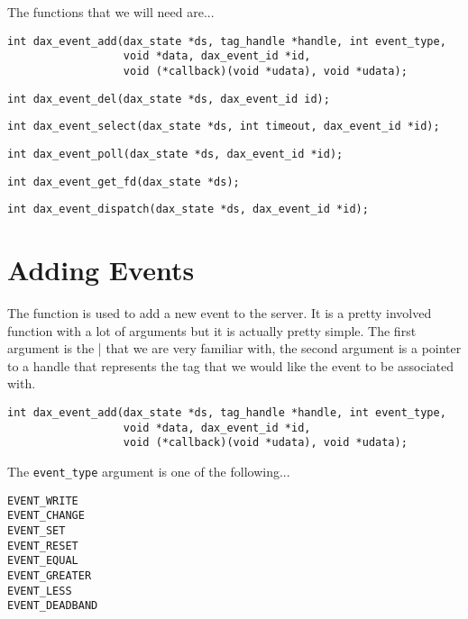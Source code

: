The functions that we will need are...

\begin{verbatim}
int dax_event_add(dax_state *ds, tag_handle *handle, int event_type,
                  void *data, dax_event_id *id, 
                  void (*callback)(void *udata), void *udata);
\end{verbatim}
\begin{verbatim}
int dax_event_del(dax_state *ds, dax_event_id id);
\end{verbatim}
\begin{verbatim}
int dax_event_select(dax_state *ds, int timeout, dax_event_id *id);
\end{verbatim}
\begin{verbatim}
int dax_event_poll(dax_state *ds, dax_event_id *id);
\end{verbatim}
\begin{verbatim}
int dax_event_get_fd(dax_state *ds);
\end{verbatim}
\begin{verbatim}
int dax_event_dispatch(dax_state *ds, dax_event_id *id);
\end{verbatim}

\section{Adding Events}

The \eventadd{} function is used to add a new event to the server.  It is a pretty involved function with a lot of arguments but it is actually pretty simple.  The first argument is the \daxstate| that we are very familiar with, the second argument is a pointer to a handle that represents the tag that we would like the event to be associated with.

\begin{verbatim}
int dax_event_add(dax_state *ds, tag_handle *handle, int event_type,
                  void *data, dax_event_id *id, 
                  void (*callback)(void *udata), void *udata);
\end{verbatim}

The \texttt{event\_type} argument is one of the following... 

\begin{verbatim}
EVENT_WRITE
EVENT_CHANGE
EVENT_SET
EVENT_RESET
EVENT_EQUAL
EVENT_GREATER
EVENT_LESS
EVENT_DEADBAND
\end{verbatim}


